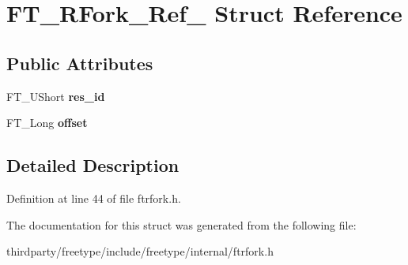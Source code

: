 \hypertarget{struct_f_t___r_fork___ref__}{}\section{F\+T\+\_\+\+R\+Fork\+\_\+\+Ref\+\_\+ Struct Reference}
\label{struct_f_t___r_fork___ref__}
\subsection*{Public Attributes}
\begin{DoxyCompactItemize}
\item 
\mbox{\label{struct_f_t___r_fork___ref___a7bca14bddf56df7903166b52e19a0500}} 
F\+T\+\_\+\+U\+Short {\bfseries res\+\_\+id}
\item 
\mbox{\label{struct_f_t___r_fork___ref___a74646e0e8649e3d8af070ddf4362bde8}} 
F\+T\+\_\+\+Long {\bfseries offset}
\end{DoxyCompactItemize}


\subsection{Detailed Description}


Definition at line 44 of file ftrfork.\+h.



The documentation for this struct was generated from the following file\+:\begin{DoxyCompactItemize}
\item 
thirdparty/freetype/include/freetype/internal/ftrfork.\+h\end{DoxyCompactItemize}
